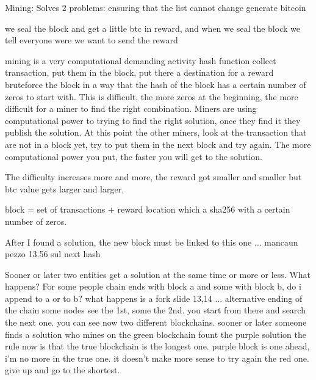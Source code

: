         Mining:
            Solves 2 problems:
                ensuring that the list cannot change 
                generate bitcoin

                we seal the block and get a little btc in reward, and when we seal the block we tell everyone were we want to send the reward

                mining is a very computational demanding activity
                    hash function 
                    collect transaction, put them in the block, put there a destination for a reward
                    bruteforce the block in a way that the hash of the block has a certain number of zeros to start with.
                    This is difficult, the more zeros at the beginning, the more difficult for a miner to find the right combination.
                    Miners are using computational power to trying to find the right solution, once they find it they publish the solution.
                    At this point the other miners, look at the transaction that are not in a block yet, try to put them in the next block and try again.
                    The more computational power you put, the faster you will get to the solution.

                    The difficulty increases more and more, the reward got smaller and smaller but btc value gets larger and larger.

                    block = set of transactions + reward location which a sha256 with a certain number of zeros.

                    After I found a solution, the new block must be linked to this one ... mancaun pezzo 13.56 sul next hash 


                    Sooner or later two entities get a solution at the same time or more or less. What happens?
                    For some people chain ends with block a and some with block b, do i append to a or to b?
                        what happens is a fork
                        slide 13,14 ...  
                            alternative ending of the chain
                            some nodes see the 1st, some the 2nd.
                            you start from there and search the next one.
                            you can see now two different blockchains.
                            sooner or later someone finds a solution
                                who mines on the green blockchain fount the purple solution
                                    the rule now is that the true blockchain is the longest one.
                                        purple block is one ahead, i'm no more in the true one. 
                                        it doesn't make more sense to try again the red one.
                                        give up and go to the shortest.
                                    
